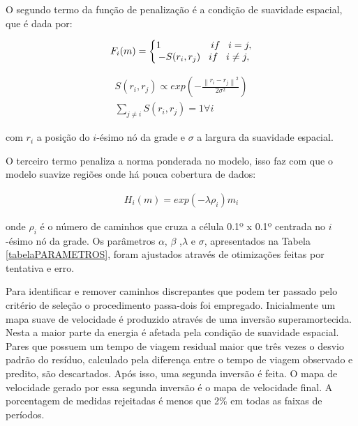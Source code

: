 O segundo termo da função de penalização é a condição de suavidade espacial, que é dada por:

\begin{eqnarray}
F_{i}(m)=
 \left\{\begin{matrix}
1 \hspace{18mm} if \hspace{3mm} i = j,
\\ 
-S(r_{i},r_{j}) \hspace{3mm} if \hspace{3mm} i \neq j,
\end{matrix}\right.
\end{eqnarray}

\begin{eqnarray}
S(r_{i},r_{j}) \propto exp(- \frac{\left \| r_{i}-r_{j}  \right \|^{2}}{2\sigma ^{2}}) \\
\sum_{j\neq i} S(r_{i},r_{j}) = 1         \forall i 
\end{eqnarray}

com $r_{i}$ a posição do $i$-ésimo nó da grade e $\sigma$ a largura da suavidade espacial.

O terceiro termo penaliza a norma ponderada no modelo, isso faz com que o modelo suavize regiões onde há pouca cobertura de dados:

\begin{eqnarray}
H_{i}(m) = exp(-\lambda \rho _{i})m_{i}
\end{eqnarray}

onde $\rho _{i}$ é o número de caminhos que cruza a célula 0.1º x 0.1º centrada no $i$-ésimo nó da grade. Os parâmetros $\alpha$, $\beta$ ,$\lambda$ e $\sigma$, apresentados na Tabela \ref{tabelaPARAMETROS}, foram ajustados através de otimizações feitas por tentativa e erro.

Para identificar e remover caminhos discrepantes que podem ter passado pelo critério de seleção o procedimento passa-dois foi empregado. Inicialmente um mapa suave de velocidade é produzido através de uma inversão superamortecida. Nesta a maior parte da energia é afetada pela condição de suavidade espacial. Pares que possuem um tempo de viagem residual maior que três vezes o desvio padrão do resíduo, calculado pela diferença entre o tempo de viagem observado e predito,  são descartados. Após isso, uma segunda inversão é feita. O mapa de velocidade gerado por essa segunda inversão é o mapa de velocidade final. A porcentagem de medidas rejeitadas é menos que 2\% em todas as faixas de períodos.

